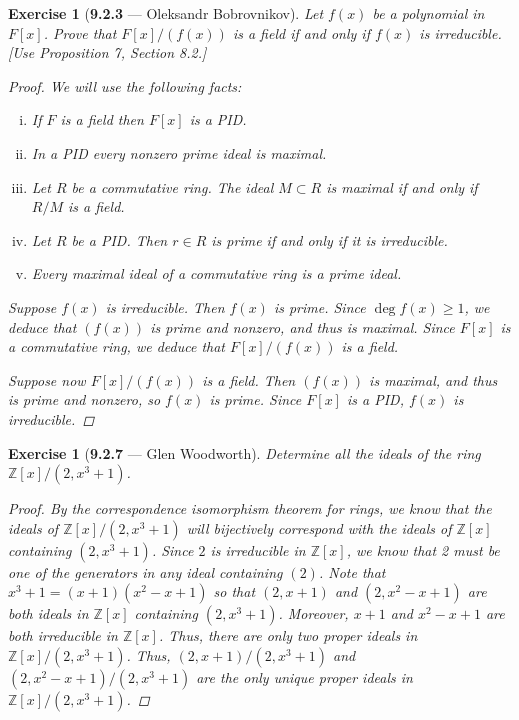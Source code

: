 \documentclass[12pt]{amsart}
\newtheorem{exercise}[theorem]{Exercise}
\theoremstyle{remark}
\newcommand{\ZZ}{{\mathbb Z}}
\theoremstyle{mycomment}
\begin{document}
  \begin{exercise}[\textbf{9.2.3} --- Oleksandr Bobrovnikov]
    Let $f(x)$ be a polynomial in $F[x]$. Prove that $F[x]/(f(x))$ is a field if and only if $f(x)$ is irreducible. [Use Proposition 7, Section 8.2.]
    \begin{proof}
      We will use the following facts:
      \begin{enumerate}[(i)]
        \item If $F$ is a field then $F[x]$ is a PID.
        \item In a PID every nonzero prime ideal is maximal.
        \item Let $R$ be a commutative ring. The ideal $M\subset R$ is maximal if and only if $R/M$ is a field.
        \item Let $R$ be a PID. Then $r\in R$ is prime if and only if it is irreducible.
        \item Every maximal ideal of a commutative ring is a prime ideal.
      \end{enumerate}
      Suppose $f(x)$ is irreducible.
      Then $f(x)$ is prime. Since $\deg f(x)\geq 1$, we deduce that $(f(x))$ is prime and nonzero, and thus is maximal.
      Since $F[x]$ is a commutative ring, we deduce that $F[x]/(f(x))$ is a field.
  
      Suppose now $F[x]/(f(x))$ is a field. Then $(f(x))$ is maximal, and thus is prime and nonzero, so $f(x)$ is prime.
      Since $F[x]$ is a PID, $f(x)$ is irreducible. 
    \end{proof}
  \end{exercise}
  \vspace{.15in}

  \begin{exercise}[\textbf{9.2.7} --- Glen Woodworth] Determine all the ideals of the ring $\ZZ[x]/(2,x^3+1)$.
    \begin{proof}
   By the correspondence isomorphism theorem for rings, we know that the ideals of $\ZZ[x]/(2,x^3+1)$ will bijectively correspond with the ideals of $\ZZ[x]$ containing $(2,x^3+1)$. Since $2$ is irreducible in $\ZZ[x]$, we know that 2 must be one of the generators in any ideal containing $(2)$. Note that $x^3+1=(x+1)(x^2-x+1)$ so that $(2,x+1)$ and $(2,x^2-x+1)$ are both ideals in $\ZZ[x]$ containing $(2,x^3+1)$.  Moreover, $x+1$ and $x^2-x+1$ are both irreducible in $\ZZ[x]$. Thus, there are only two proper ideals in $\ZZ[x]/(2,x^3+1)$. Thus, $(2,x+1)/(2,x^3+1)$ and $(2,x^2-x+1)/(2,x^3+1)$ are the only unique proper ideals in $ \ZZ[x]/(2,x^3+1)$. 
     \end{proof}
   \end{exercise}
  \vspace{.15in}
\end{document}
